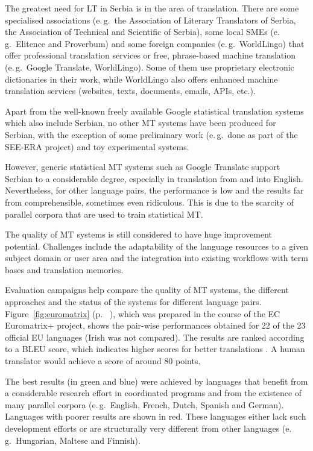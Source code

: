 \begin{multicols}{2}
The greatest need for LT in Serbia is in the area of translation. There are some specialised associations (e.\,g.~the Association of Literary Translators of Serbia, the Association of Technical and Scientific of Serbia), some local SMEs (e.\,g.~Elitence and Proverbum) and some foreign companies (e.\,g.~WorldLingo) that offer professional translation services or free, phrase-based machine translation (e.\,g.~Google Translate, WorldLingo). Some of them use proprietary electronic dictionaries in their work, while WorldLingo also offers enhanced machine translation services (websites, texts, documents, emails, APIs, etc.). 

Apart from the well-known freely available Google statistical translation systems which also include Serbian, no other MT systems have been produced for Serbian, with the exception of some preliminary work (e.\,g.~done as part of the SEE-ERA project) and toy experimental systems. 

However, generic statistical MT systems such as Google Translate support Serbian to a considerable degree, especially in translation from and into English. Nevertheless, for other language pairs, the performance is low and the results far from comprehensible, sometimes even ridiculous. This is due to the scarcity of parallel corpora that are used to train statistical MT.

The quality of MT systems is still considered to have huge improvement potential. Challenges include the adaptability of the language resources to a given subject domain or user area and the integration into existing workflows with term bases and translation memories. 

Evaluation campaigns help compare the quality of MT systems, the different approaches and the status of the systems for different language pairs. Figure~\ref{fig:euromatrix} (p. ~\pageref{fig:euromatrix}), which was prepared in the course of the EC Euromatrix+ project, shows the pair-wise performances obtained for 22 of the 23 official EU languages (Irish was not compared). The results are ranked according to a BLEU score, which indicates higher scores for better translations \cite{bleu1}. A human translator would achieve a score of around 80 points.

The best results (in green and blue) were achieved by languages that benefit from a considerable research effort in coordinated programs and from the existence of many parallel corpora (e.\,g.~English, French, Dutch, Spanish and German). Languages with poorer results are shown in red. These languages either lack such development efforts or are structurally very different from other languages (e.\,g.~Hungarian, Maltese and Finnish).



\end{multicols}

